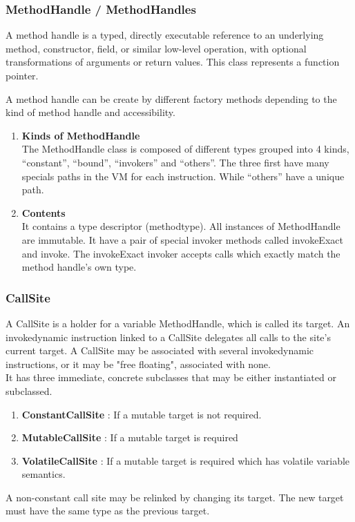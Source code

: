 \documentclass{sigplanconf}
\def \DALVIK{\mbox{Dalvik}\xspace}
\def \VM{VM\xspace}
\begin{document}

        

      \subsubsection{MethodHandle / MethodHandles}
        A method handle is a typed, directly executable reference to
        an underlying method, constructor, field, or similar low-level operation,
        with optional transformations of arguments or return values.
        This class represents a function pointer.
        
        A method handle can be create by different factory methods depending to the kind of method handle and accessibility.
        

        \begin{enumerate}
          \item \textbf{Kinds of MethodHandle}\\
            The MethodHandle class is composed of different types grouped into 4 kinds,
            ``constant'', ``bound'', ``invokers'' and ``others''.
            The three first have many specials paths in the \VM for each instruction.
            While ``others'' have a unique path.
          \item \textbf{Contents}\\
            It contains a type descriptor (methodtype).
            All instances of MethodHandle are immutable.
            It have a pair of special invoker methods called invokeExact and invoke.
            The invokeExact invoker accepts calls which exactly match the method handle's own type.
        \end{enumerate}

      \subsubsection{CallSite}
        A CallSite is a holder for a variable MethodHandle, which is called its target.
        An invokedynamic instruction linked to a CallSite delegates all calls to the site's current target.
        A CallSite may be associated with several invokedynamic instructions,
        or it may be "free floating", associated with none.\\

        It has three immediate, concrete subclasses that may be either instantiated or subclassed.
        \begin{enumerate}
          \item \textbf{ConstantCallSite} : If a mutable target is not required.
          \item \textbf{MutableCallSite}  : If a mutable target is required
          \item \textbf{VolatileCallSite} : If a mutable target is required which has volatile variable semantics.
        \end{enumerate}
        A non-constant call site may be relinked by changing its target.
        The new target must have the same type as the previous target.
\end{document}
